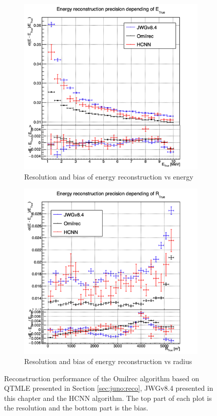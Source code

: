 \documentclass[../main.tex]{subfiles}
\begin{document}
\begin{figure}[ht]
  \centering
  \begin{subfigure}[t]{0.48\linewidth}
    \centering
    \includegraphics[width=\linewidth]{images/jgnn/hcnn/MESBvETC.png}
    \caption{Resolution and bias of energy reconstruction vs energy}
    \label{fig:jgnn:MESBvETC_hcnn}
  \end{subfigure}
  \begin{subfigure}[t]{0.48\linewidth}
    \centering
    \includegraphics[width=\linewidth]{images/jgnn/hcnn/MESBvRTC.png}
    \caption{Resolution and bias of energy reconstruction vs radius}
    \label{fig:jgnn:MESBvRTC_hcnn}
  \end{subfigure}
  \caption{Reconstruction performance of the Omilrec algorithm based on QTMLE presented in Section \ref{sec:juno:reco}, JWGv8.4 presented in this chapter and the HCNN algorithm. The top part of each plot is the resolution and the bottom part is the bias.}
  \label{fig:jgnn:results_hcnn_1}
\end{figure}
\end{document}
